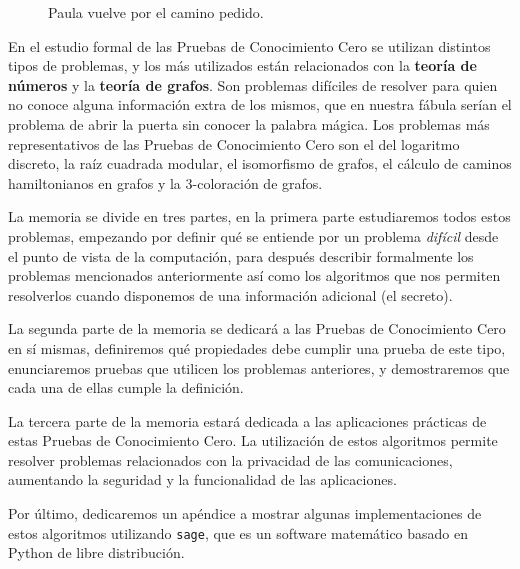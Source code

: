 \begin{figure}[!htb]
	\caption*{Paula vuelve por el camino pedido.\\ }\label{fig:awesome_image3}
	\endminipage
\end{figure}



\hfil

En el estudio formal de las Pruebas de Conocimiento Cero se utilizan distintos tipos de problemas, y los más utilizados est\'an relacionados con la \textbf{teor\'ia de n\'umeros}
y la \textbf{teor\'ia de grafos}. Son problemas difíciles de resolver para quien no conoce alguna información extra de los mismos, que en nuestra fábula serían el problema de abrir la puerta sin conocer la
palabra mágica. Los problemas más representativos de las Pruebas de Conocimiento Cero son el del logaritmo discreto, la raíz cuadrada modular, el isomorfismo de grafos, el c\'alculo de caminos
hamiltonianos en grafos y la 3-coloración de grafos.

La memoria se divide en tres partes, en la primera parte estudiaremos todos estos problemas, empezando por
definir qué se entiende por un problema \textit{difícil} desde el punto de vista de la computaci\'on, para despu\'es describir formalmente los problemas mencionados anteriormente
as\'i como los algoritmos que nos permiten resolverlos cuando disponemos de una informaci\'on adicional (el secreto).

La segunda parte de la memoria se dedicar\'a a las Pruebas de Conocimiento Cero en s\'i mismas, definiremos qué propiedades debe cumplir una prueba de este tipo,
enunciaremos pruebas que utilicen los problemas anteriores, y demostraremos que cada una de ellas cumple la definición.

La tercera parte de la memoria estar\'a dedicada a las aplicaciones prácticas de estas Pruebas de Conocimiento Cero. La utilizaci\'on de estos algoritmos permite resolver problemas
relacionados con la privacidad de las comunicaciones, aumentando la seguridad y la funcionalidad de las aplicaciones.

Por \'ultimo, dedicaremos un ap\'endice a mostrar algunas implementaciones de estos algoritmos utilizando {\tt sage}, que es un software matem\'atico basado en Python de
libre distribuci\'on.
